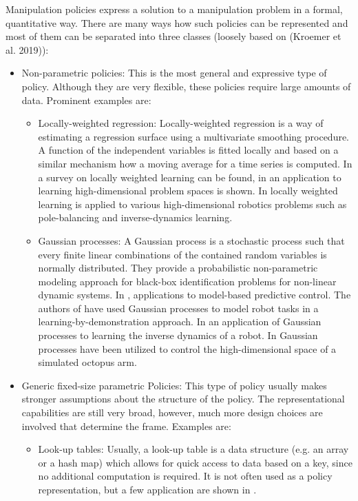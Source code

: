 Manipulation policies express a solution to a manipulation problem in a formal, quantitative way. There are many ways how such policies can be represented and most of them can be separated into three classes (loosely based on (Kroemer et al. 2019)):
\begin{itemize}
\item Non-parametric policies: This is the most general and expressive type of policy.
Although they are very flexible, these policies require large amounts of data. 
Prominent examples are:
\begin{itemize}
\item Locally-weighted regression: Locally-weighted regression is a way of estimating a regression surface using a multivariate smoothing procedure. A function of the independent variables is fitted locally and based on a similar mechanism how a moving average for a time series is computed. In \cite{Atkeson.1997} a survey on locally weighted learning can be found, in \cite{Vijayakumar.2000} an application to learning high-dimensional problem spaces is shown. In \cite{Schaal.2000} locally weighted learning is applied to various high-dimensional robotics problems such as pole-balancing and inverse-dynamics learning.
\item Gaussian processes: A Gaussian process is a stochastic process such that every finite linear combinations of the contained random variables is normally distributed. They provide a probabilistic non-parametric modeling approach for black-box identification problems for non-linear dynamic systems. In \cite{Rasmussen.2004}, applications to model-based predictive control. The authors of \cite{Schneider.2010} have used Gaussian processes to model robot tasks in a learning-by-demonstration approach. In \cite{NguyenTuong.2009} an application of Gaussian processes to learning the inverse dynamics of a robot. In \cite{Engel.2005} Gaussian processes have been utilized to control the high-dimensional space of a simulated octopus arm.
\end{itemize}
\item Generic fixed-size parametric Policies: This type of policy usually makes stronger assumptions about the structure of the policy.
The representational capabilities are still very broad, however, much more design choices are involved that determine the frame.
Examples are:
\begin{itemize}
\item Look-up tables: Usually, a look-up table is a data structure (e.g. an array or a hash map) which allows for quick access to data based on a key, since no additional computation is required. It is not often used as a policy representation, but a few application are shown in \cite{Sutton.2018}.

\end{itemize}
\end{itemize}
